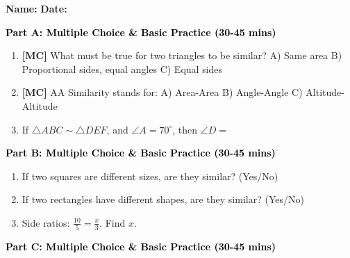 \documentclass[12pt, letterpaper, fleqn]{article}
\newcommand{\blank}{\underline{\hspace{2.2cm}}}
\begin{document}
\textbf{Name:} \underline{\hspace{5cm}}
\hfill
\textbf{Date:} \underline{\hspace{3cm}}\\


\begin{tcolorbox}[colback=customteal!20]
\large\textcolor{black}{\textbf{Part A: Multiple Choice \& Basic Practice (30-45 mins)}}
\end{tcolorbox}

\vspace{3mm}

\begin{enumerate}[itemsep=2.5cm, leftmargin=0.6cm]
\item \textbf{[MC]} What must be true for two triangles to be similar?
A) Same area B) Proportional sides, equal angles C) Equal sides
\item \textbf{[MC]} AA Similarity stands for:
A) Area-Area B) Angle-Angle C) Altitude-Altitude
\item If $\triangle ABC \sim \triangle DEF$, and $\angle A = 70^\circ$, then $\angle D =$ \blank
\end{enumerate}

\newpage

\begin{tcolorbox}[colback=customteal!20]
\large\textcolor{black}{\textbf{Part B: Multiple Choice \& Basic Practice (30-45 mins)}}
\end{tcolorbox}

\vspace{3mm}

\begin{enumerate}[itemsep=2.5cm, leftmargin=0.6cm, resume]
\item If two squares are different sizes, are they similar? (Yes/No) \blank
\item If two rectangles have different shapes, are they similar? (Yes/No) \blank
\item Side ratios: $\frac{10}{5} = \frac{x}{3}$. Find $x$. \blank
\end{enumerate}

\newpage

\begin{tcolorbox}[colback=customteal!20]
\large\textcolor{black}{\textbf{Part C: Multiple Choice \& Basic Practice (30-45 mins)}}
\end{tcolorbox}

\vspace{3mm}
\end{document}
